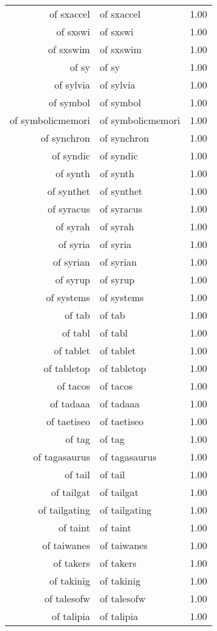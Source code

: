 \begin{table}[ht]
\begin{tabular}{rlr}
  of sxaccel & of sxaccel & 1.00 \\ 
  of sxswi & of sxswi & 1.00 \\ 
  of sxswim & of sxswim & 1.00 \\ 
  of sy & of sy & 1.00 \\ 
  of sylvia & of sylvia & 1.00 \\ 
  of symbol & of symbol & 1.00 \\ 
  of symbolicmemori & of symbolicmemori & 1.00 \\ 
  of synchron & of synchron & 1.00 \\ 
  of syndic & of syndic & 1.00 \\ 
  of synth & of synth & 1.00 \\ 
  of synthet & of synthet & 1.00 \\ 
  of syracus & of syracus & 1.00 \\ 
  of syrah & of syrah & 1.00 \\ 
  of syria & of syria & 1.00 \\ 
  of syrian & of syrian & 1.00 \\ 
  of syrup & of syrup & 1.00 \\ 
  of systems & of systems & 1.00 \\ 
  of tab & of tab & 1.00 \\ 
  of tabl & of tabl & 1.00 \\ 
  of tablet & of tablet & 1.00 \\ 
  of tabletop & of tabletop & 1.00 \\ 
  of tacos & of tacos & 1.00 \\ 
  of tadaaa & of tadaaa & 1.00 \\ 
  of taetiseo & of taetiseo & 1.00 \\ 
  of tag & of tag & 1.00 \\ 
  of tagasaurus & of tagasaurus & 1.00 \\ 
  of tail & of tail & 1.00 \\ 
  of tailgat & of tailgat & 1.00 \\ 
  of tailgating & of tailgating & 1.00 \\ 
  of taint & of taint & 1.00 \\ 
  of taiwanes & of taiwanes & 1.00 \\ 
  of takers & of takers & 1.00 \\ 
  of takinig & of takinig & 1.00 \\ 
  of talesofw & of talesofw & 1.00 \\ 
  of talipia & of talipia & 1.00 \\ 

\end{tabular}
\end{table}
